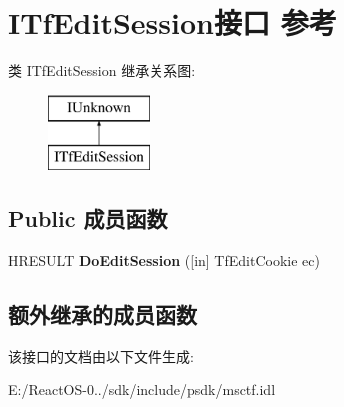 \hypertarget{interface_i_tf_edit_session}{}\section{I\+Tf\+Edit\+Session接口 参考}
\label{interface_i_tf_edit_session}
类 I\+Tf\+Edit\+Session 继承关系图\+:\begin{figure}[H]
\begin{center}
\leavevmode
\includegraphics[height=2.000000cm]{interface_i_tf_edit_session}
\end{center}
\end{figure}
\subsection*{Public 成员函数}
\begin{DoxyCompactItemize}
\item 
\mbox{\label{interface_i_tf_edit_session_a80569484e7de312b390b4de2332db204}} 
H\+R\+E\+S\+U\+LT {\bfseries Do\+Edit\+Session} (\mbox{[}in\mbox{]} Tf\+Edit\+Cookie ec)
\end{DoxyCompactItemize}
\subsection*{额外继承的成员函数}


该接口的文档由以下文件生成\+:\begin{DoxyCompactItemize}
\item 
E\+:/\+React\+O\+S-\/0../sdk/include/psdk/msctf.\+idl\end{DoxyCompactItemize}
